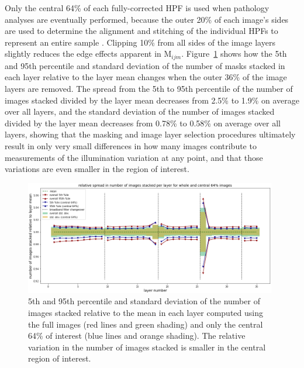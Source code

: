\documentclass[letterpaper,11pt]{article}
\newcommand{\reffig}[1]{Figure~\ref{#1}}
\newcommand{\Mu}{\mathrm{M}}
\begin{document}
Only the central 64\% of each fully-corrected HPF is used when pathology analyses are eventually performed, because the outer 20\% of each image's sides are used to determine the alignment and stitching of the individual HPFs to represent an entire sample \cite{Heshy}. Clipping 10\% from all sides of the image layers slightly reduces the edge effects apparent in $\Mu_{ijm}$. \reffig{fig:removing_image_edges_effect_on_mask_stacks} shows how the 5th and 95th percentile and standard deviation of the number of masks stacked in each layer relative to the layer mean changes when the outer 36\% of the image layers are removed. The spread from the 5th to 95th percentile of the number of images stacked divided by the layer mean decreases from 2.5\% to 1.9\% on average over all layers, and the standard deviation of the number of images stacked divided by the layer mean decreases from 0.78\% to 0.58\% on average over all layers, showing that the masking and image layer selection procedures ultimately result in only very small differences in how many images contribute to measurements of the illumination variation at any point, and that those variations are even smaller in the region of interest.

\begin{figure}[!ht]
\centering
\includegraphics[width=0.98\textwidth]{images/measuring_flatfield_corrections/mask_stack_variation_reduction_vectra}
\caption{\footnotesize 5th and 95th percentile and standard deviation of the number of images stacked relative to the mean in each layer computed using the full images (red lines and green shading) and only the central 64\% of interest (blue lines and orange shading). The relative variation in the number of images stacked is smaller in the central region of interest.}
\label{fig:removing_image_edges_effect_on_mask_stacks}
\end{figure} 
\end{document}
